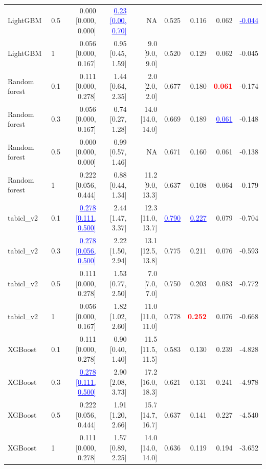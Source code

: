 \begin{table}[!htbp]
{\begin{tabular}{llrrrrrrr}
LightGBM & 0.5 & 0.000 [0.000, 0.000] & \textcolor{blue}{\underline{0.23 [0.00, 0.70]}} & NA & 0.525 & 0.116 & 0.062 & \textcolor{blue}{\underline{-0.044}} \\
LightGBM & 1 & 0.056 [0.000, 0.167] & 0.95 [0.45, 1.59] & 9.0 [9.0, 9.0] & 0.520 & 0.129 & 0.062 & -0.045 \\
Random forest & 0.1 & 0.111 [0.000, 0.278] & 1.44 [0.64, 2.35] & 2.0 [2.0, 2.0] & 0.677 & 0.180 & \textcolor{red}{\textbf{0.061}} & -0.174 \\
Random forest & 0.3 & 0.056 [0.000, 0.167] & 0.74 [0.27, 1.28] & 14.0 [14.0, 14.0] & 0.669 & 0.189 & \textcolor{blue}{\underline{0.061}} & -0.148 \\
Random forest & 0.5 & 0.000 [0.000, 0.000] & 0.99 [0.57, 1.46] & NA & 0.671 & 0.160 & 0.061 & -0.138 \\
Random forest & 1 & 0.222 [0.056, 0.444] & 0.88 [0.44, 1.34] & 11.2 [9.0, 13.3] & 0.637 & 0.108 & 0.064 & -0.179 \\
tabicl\_v2 & 0.1 & \textcolor{blue}{\underline{0.278 [0.111, 0.500]}} & 2.44 [1.47, 3.37] & 12.3 [11.0, 13.7] & \textcolor{blue}{\underline{0.790}} & \textcolor{blue}{\underline{0.227}} & 0.079 & -0.704 \\
tabicl\_v2 & 0.3 & \textcolor{blue}{\underline{0.278 [0.056, 0.500]}} & 2.22 [1.50, 2.94] & 13.1 [12.5, 13.8] & 0.775 & 0.211 & 0.076 & -0.593 \\
tabicl\_v2 & 0.5 & 0.111 [0.000, 0.278] & 1.53 [0.77, 2.50] & 7.0 [7.0, 7.0] & 0.750 & 0.203 & 0.083 & -0.772 \\
tabicl\_v2 & 1 & 0.056 [0.000, 0.167] & 1.82 [1.02, 2.60] & 11.0 [11.0, 11.0] & 0.778 & \textcolor{red}{\textbf{0.252}} & 0.076 & -0.668 \\
XGBoost & 0.1 & 0.111 [0.000, 0.278] & 0.90 [0.40, 1.40] & 11.5 [11.5, 11.5] & 0.583 & 0.130 & 0.239 & -4.828 \\
XGBoost & 0.3 & \textcolor{blue}{\underline{0.278 [0.111, 0.500]}} & 2.90 [2.08, 3.73] & 17.2 [16.0, 18.3] & 0.621 & 0.131 & 0.241 & -4.978 \\
XGBoost & 0.5 & 0.222 [0.056, 0.444] & 1.91 [1.20, 2.66] & 15.7 [14.7, 16.7] & 0.637 & 0.141 & 0.227 & -4.540 \\
XGBoost & 1 & 0.111 [0.000, 0.278] & 1.57 [0.89, 2.25] & 14.0 [14.0, 14.0] & 0.636 & 0.119 & 0.194 & -3.652 \\
\bottomrule
\end{tabular}
}
\end{table}
